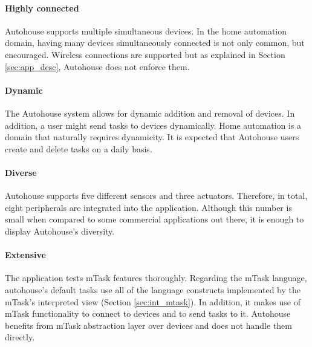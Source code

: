 \paragraph{Highly connected} Autohouse supports multiple simultaneous devices. In the home automation domain, having many devices simultaneously connected is not only common, but encouraged. Wireless connections are supported but as explained in Section \ref{sec:app_desc}, Autohouse does not enforce them. 

\paragraph{Dynamic} The Autohouse system allows for dynamic addition and removal of devices. In addition, a user might send tasks to devices dynamically. Home automation is a domain that naturally requires dynamicity. It is expected that Autohouse users create and delete tasks on a daily basis.

\paragraph{Diverse} Autohouse supports five different sensors and three actuators. Therefore, in total, eight peripherals are integrated into the application. Although this number is small when compared to some commercial applications out there, it is enough to display Autohouse's diversity.

\paragraph{Extensive} The application tests \gls{mTask} features thoroughly. Regarding the \gls{mTask} language, \gls{autohouse}'s default tasks use all of the language constructs implemented by the \gls{mTask}'s interpreted view (Section \ref{sec:int_mtask}). In addition, it makes use of \gls{mTask} functionality to connect to devices and to send tasks to it. Autohouse benefits from \gls{mTask} abstraction layer over devices and does not handle them directly.

